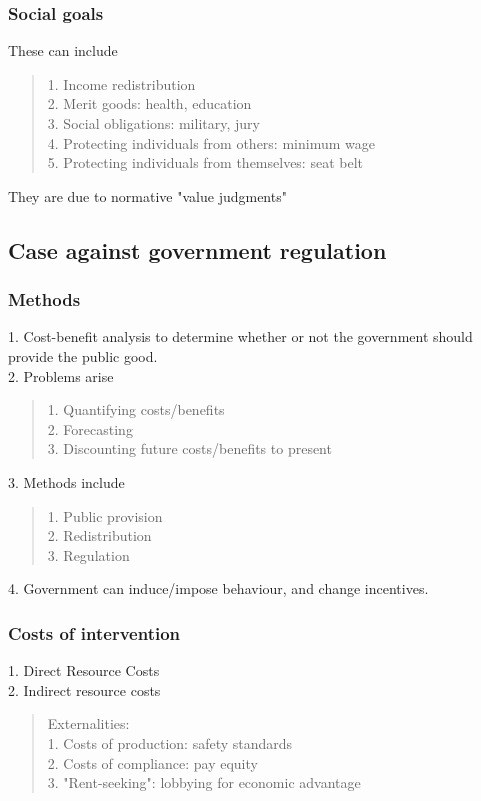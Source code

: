 \subsubsection{Social goals}
These can include
\begin{quote}
    1. Income redistribution \\
    2. Merit goods: health, education \\
    3. Social obligations: military, jury \\
    4. Protecting individuals from others: minimum wage \\
    5. Protecting individuals from themselves: seat belt
\end{quote}
They are due to normative "value judgments"

\subsection{Case against government regulation}
\subsubsection{Methods}
1. Cost-benefit analysis to determine whether or not the government should provide the public good. \\
2. Problems arise
\begin{quote}
    1. Quantifying costs/benefits \\
    2. Forecasting \\
    3. Discounting future costs/benefits to present
\end{quote}
3. Methods include
\begin{quote}
    1. Public provision \\
    2. Redistribution \\
    3. Regulation
\end{quote}
4. Government can induce/impose behaviour, and change incentives.

\subsubsection{Costs of intervention}
1. Direct Resource Costs \\
2. Indirect resource costs
\begin{quote}
    Externalities: \\
    1. Costs of production: safety standards \\
    2. Costs of compliance: pay equity \\
    3. "Rent-seeking": lobbying for economic advantage
\end{quote}

